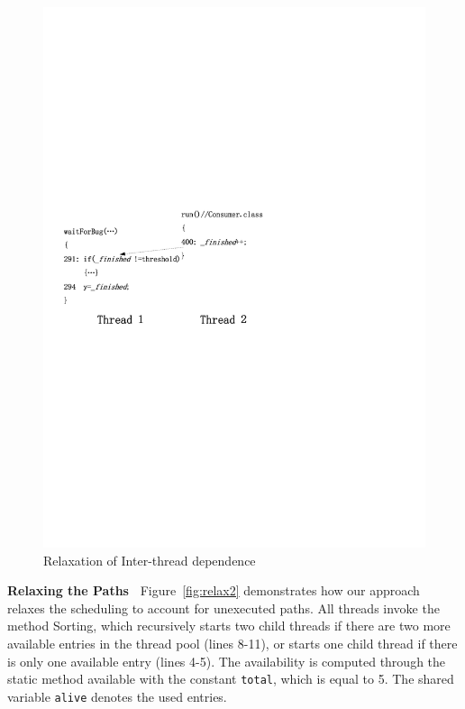  

\begin{figure}[htp]
\centering
\includegraphics[scale=0.45]{cases/Visio-bbuffer.pdf}
\caption{Relaxation of Inter-thread dependence}\label{fig:relax1}
\end{figure}

{\bf Relaxing the Paths\ } Figure~\ref{fig:relax2} demonstrates how our approach relaxes the scheduling to account for  unexecuted paths. 
All threads invoke the method {\sf Sorting}, which recursively starts two child threads if there are two more available entries in the thread pool (lines 8-11), or  starts one child thread if there is only one available entry (lines 4-5).  The availability is computed through the static method {\sf available} with the constant {\tt total}, which is equal to 5. The shared variable {\tt alive} denotes the used entries.

